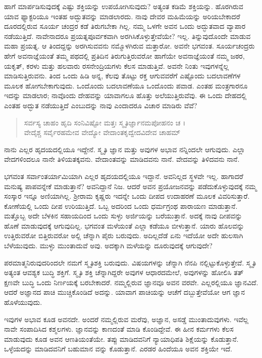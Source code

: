 ಹಾಗೆ ಮಾರ್ಪಡಿಸುವುದಕ್ಕೆ ಎಷ್ಟು ಶಕ್ತಿಯನ್ನು ಉಪಯೋಗಿಸುವುದು? ಅತ್ಯಂತ ಕಡಿಮೆ ಶಕ್ತಿಯನ್ನು. ಹೊರಗಿರುವ ಯಾವ ಫ್ಯಾಕ್ಟರಿಯೂ ಇಂತಹ ಅದ್ಭುತವನ್ನು ಮಾಡಲಾರದು. ನಾವು ದೇವರ ಮಹಿಮೆಯನ್ನು ಅರಿಯಬೇಕಾದರೆ ದೂರದಲ್ಲಿರುವ ಸೂರ್ಯ ಚಂದ್ರರ ಕಡೆ ತಿರುಗಬೇಕಾ ಗಿಲ್ಲ. ನಮ್ಮ ಒಳಗೇ ಅವನ ಒಂದು ಅದ್ಭುತವಾದ ವ್ಯಾಪಾರ ನಡೆಯುತ್ತಿದೆ. ನಾವೇನಾದರೂ ಪ್ರಯತ್ನಪೂರ್ವಕವಾಗಿ ಅರಗಿಸಿಕೊಳ್ಳುತ್ತೇವೆಯೇ? ಇಲ್ಲ. ತಿನ್ನುವುದೊಂದೇ ಮಾಡುವ ಮಹಾ ಪ್ರಯತ್ನ. ಆ ತಿಂದದ್ದನ್ನು ಅರಗಿಸುವವನು ನಮ್ಮೊಳಗಿರುವ ಮತ್ತಾರೋ. ಅವನೇ ಭಗವಂತ. ಸೂರ್ಯಚಂದ್ರರು ಹೇಗೆ ಅವನಾಜ್ಞೆಯಂತೆ ತಮ್ಮ ಪಥದಲ್ಲಿ ಪ್ರತಿದಿನ ತಿರುಗುತ್ತಿರುವರೋ ಹಾಗೆಯೇ ಅವನಾಜ್ಞೆಯಂತೆ ನಮ್ಮ ಜಠರ, ಯಕೃತ್, ಕರಳು ಮತ್ತು ಹಲವಾರು ರಸನೇಂದ್ರಿಯಗಳು ಕೆಲಸ ಮಾಡುತ್ತಿವೆ. ಅವನೇ ನಿಂತು ಇವುಗಳನ್ನೆಲ್ಲ ಮಾಡಿಸುತ್ತಿರುವನು. ತಿಂದ ಒಂದು ಹಿಡಿ ಅನ್ನ, ಕೆಲವು ತೊಟ್ಟು ರಕ್ತ ಆಗುವವರೆಗೆ ಎಷ್ಟೊಂದು ಬದಲಾವಣೆಗಳ ಮೂಲಕ ಹೋಗಬೇಕಾಗುವುದು. ಒಂದೊಂದು ಬದಲಾವಣೆಯೂ ಒಂದೊಂದು ಪವಾಡ. ಎಂತಹ ಮಂತ್ರಗಾರನೂ ಇದನ್ನು ಮಾಡಲಾರ; ನಾವೊಂದು ದೇಹವನ್ನು ಯಾವಾಗಲೂ ಹೊತ್ತು ಅಲೆಯುತ್ತಿರುವೆವು. ಈ ಒಂದು ದೇಹದಲ್ಲಿ ಎಂತಹ ಅದ್ಭುತ ನಡೆಯುತ್ತಿದೆ ಎಂಬುದನ್ನು ನಾವು ಎಂದಾದರೂ ವಿಚಾರ ಮಾಡಿರು ವೆವೆ?

\begin{verse}
ಸರ್ವಸ್ಯ ಚಾಹಂ ಹೃದಿ ಸಂನಿವಿಷ್ಟೋ ಮತ್ತಃ ಸ್ಮೃತಿರ್ಜ್ಞಾನಮಪೋಹನಂ ಚ ।\\ವೇದೈಶ್ಚ ಸರ್ವೈರಹಮೇವ ವೇದ್ಯೋ ವೇದಾಂತಕೃದ್ವೇದವಿದೇವ ಚಾಹಮ್ 
\end{verse}

{\small ನಾನು ಎಲ್ಲರ ಹೃದಯದಲ್ಲಿಯೂ ಇದ್ದೇನೆ. ಸ್ಮೃತಿ ಜ್ಞಾನ ಮತ್ತು ಅವುಗಳ ಅಭಾವ ನನ್ನಿಂದಲೇ ಆಗುವುದು. ಎಲ್ಲಾ ವೇದಗಳಿಂದಲೂ ನಾನೇ ತಿಳಿಯತಕ್ಕವನು. ವೇದಾಂತವನ್ನು ಮಾಡಿದವನು ನಾನೆ. ವೇದವನ್ನು ತಿಳಿದವನು ನಾನೆ.}

ಭಗವಂತ ಸರ್ವಾಂತರ್ಯಾಮಿಯಾಗಿ ಎಲ್ಲರ ಹೃದಯದಲ್ಲಿಯೂ ಇದ್ದಾನೆ. ಅವನಿಲ್ಲದ ಸ್ಥಳವೇ ಇಲ್ಲ. ಹಾಗಾದರೆ ಮನುಷ್ಯ ಪಾಪವನ್ನೇಕೆ ಮಾಡುತ್ತಾನೆ? ಅವನಿದ್ದಾನೆ ನಿಜ. ಆದರೆ ಅವನ ಪ್ರಯೋಜನವನ್ನು ಪಡೆದುಕೊಳ್ಳುವುದಕ್ಕೆ ನಮ್ಮ ಸಂಸ್ಕಾರ ಇನ್ನೂ ಅಣಿಯಾಗಿಲ್ಲ. ಶ್ರೀರಾಮ ಕೃಷ್ಣರು ಇದನ್ನೇ ಒಂದು ದೀಪದ ಉದಾಹರಣೆ ಮೂಲಕ ವಿವರಿಸುತ್ತಾರೆ. ಕೋಣೆಯಲ್ಲಿ ಒಂದು ದೀಪ ಉರಿಯುತ್ತಿದೆ. ಒಬ್ಬ ಅದರಿಂದ ಒಂದು ಧರ್ಮಗ್ರಂಥ ಪಾರಾಯಣ ಮಾಡುತ್ತಾನೆ. ಮತ್ತೊಬ್ಬ ಅದೇ ಬೆಳಕಿನ ಸಹಾಯದಿಂದ ಒಂದು ಸುಳ್ಳು ಅರ್ಜಿಯನ್ನು ಬರೆಯುತ್ತಾನೆ. ಅದಕ್ಕೆ ನಾವು ದೀಪವನ್ನು ಹೊಣೆ ಮಾಡುವುದಕ್ಕೆ ಆಗುವುದಿಲ್ಲ. ಭಗವಂತ ಮಳೆಯಂತೆ ಎಲ್ಲಾ ಕಡೆಯೂ ಬೀಳುತ್ತಾನೆ. ಯಾರು ಹೊಲವನ್ನು ಉತ್ತಿರುವರೋ ಬಿತ್ತಿರುವರೋ ಅಲ್ಲಿ ಚೆನ್ನಾಗಿ ಪೈರು ಬರುವುದು. ಅದಿಲ್ಲದೆಡೆ ಏನು ಇದೆಯೋ ಅದೇ ಹುಲಸಾಗಿ ಬೆಳೆಯುವುದು. ಮುಳ್ಳು ಮುಂತಾದುವೆ ಅವು. ಅದಕ್ಕಾಗಿ ಮಳೆಯನ್ನು ದೂರುವುದಕ್ಕೆ ಆಗುವುದೇ?

ಪರಮಾತ್ಮನಿರುವುದರಿಂದಲೇ ನಮಗೆ ಸ್ಮೃತಿಶಕ್ತಿ ಬರುವುದು. ವಿಷಯಗಳನ್ನು ಚೆನ್ನಾಗಿ ನೆನಪಿ ನಲ್ಲಿಟ್ಟುಕೊಳ್ಳುತ್ತೇವೆ. ಸ್ಮೃತಿ ಅತ್ಯಂತ ಆವಶ್ಯಕ ಬುದ್ಧಿ ಶಕ್ತಿಗೆ. ಸ್ಮೃತಿ ಶಕ್ತಿ ಚೆನ್ನಾಗಿದ್ದರೇ ಅವುಗಳ ಆಧಾರದಮೇಲೆ, ಅವುಗಳನ್ನು ಹೋಲಿಸಿ ತತ್​ಕ್ಷಣವೇ ಬುದ್ಧಿ ಒಂದು ನಿರ್ಣಯಕ್ಕೆ ಬರಬೇಕಾದರೆ. ನಮ್ಮಲ್ಲಿರುವ ಜ್ಞಾನವೂ ಅವನ ವರವೇ. ಎಲ್ಲರಲ್ಲಿಯೂ ಜ್ಞಾನವಿದೆ. ಆದರೆ ಅಜ್ಞಾನದ ಪಾಚಿ ಮುಚ್ಚಿಕೊಂಡಿದೆ ಅದನ್ನು. ಯಾವಾಗ ಪಾಚಿಯನ್ನು ಆಚೆಗೆ ದಬ್ಬುತ್ತೇವೆಯೋ ಆಗ ಜ್ಞಾನ ಹೊಳೆಯುವುದು.

ಇವುಗಳ ಅಭಾವ ಕೂಡ ಅವನದೇ. ಅಂದರೆ ನಮ್ಮಲ್ಲಿರುವ ಮರೆವು, ಅಜ್ಞಾನ, ಅಸಡ್ಡೆ ಮುಂತಾದುವುಗಳು. ಇವೆಲ್ಲ ನಾವೇ ಸಂಪಾದಿಸಿದ ಕಶ್ಮಲಗಳು. ಜ್ಞಾನವನ್ನು ಕಾಣದಂತೆ ಮಾಡಿ ಕೊಂಡಿದ್ದೇವೆ. ಈ ಹೀನ ಕರ್ಮಗಳು ಕೆಲಸ ಮಾಡುವುದು ಕೂಡ ಅವನ ಆಣತಿಯಂತೆಯೇ. ತಪ್ಪು ಮಾಡಿದವನಿಗೆ ನ್ಯಾಯಾಧಿಪತಿ ಶಿಕ್ಷೆಯನ್ನು ಕೊಡುತ್ತಾನೆ. ಒಳ್ಳೆಯದನ್ನು ಮಾಡಿದವನಿಗೆ ಬಹುಮಾನ ವನ್ನು ಕೊಡುತ್ತಾನೆ. ಎರಡರ ಹಿಂದೆಯೂ ಅವನ ಶಕ್ತಿಯೇ ಇದೆ.

